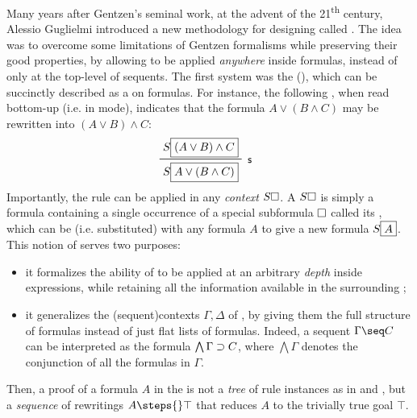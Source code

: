 Many years after Gentzen's seminal work, at the advent of the
21\textsuperscript{th} century, Alessio Guglielmi introduced a new methodology
for designing  called 
. The idea was to overcome some limitations of
Gentzen formalisms while preserving their good properties, by allowing
 to be applied \emph{anywhere} inside formulas, instead of
only at the top-level of sequents. The
first  system was the 
(), which can be succinctly described as a 
on formulas. For instance, the following , when read
bottom-up (i.e. in  mode), indicates that the formula $A \lor (B
\land C)$ may be rewritten into $(A \lor B) \land C$:
$$\R[\rsf{s}]{S\select{(A \lor B) \land C}}{S\select{A \lor (B \land C)}}$$
Importantly, the rule can be applied in any \emph{context} $S\square$. A
 $S\square$ is simply a formula containing a single occurrence of a
special subformula $\square$ called its , which can be 
(i.e. substituted) with any formula $A$ to give a new formula $S\fbox{$A$}$.
This notion of  serves two purposes:
\begin{itemize}
  \item it formalizes the ability of  to be applied at an
  arbitrary \emph{depth} inside expressions, while retaining all the information
  available in the surrounding ;
  \item it generalizes the \kl(sequent){contexts} $\Gamma, \Delta$ of
  , by giving them the full structure of formulas instead
  of just flat lists of formulas. Indeed, a sequent $\Gamma \seq C$ can be
  interpreted as the formula $\bigwedge \Gamma \supset C$, where $\bigwedge
  \Gamma$ denotes the conjunction of all the formulas in $\Gamma$.
\end{itemize}
Then, a proof of a formula $A$ in the  is not a
\emph{tree} of rule instances as in  and , but a \emph{sequence} of rewritings $A \steps{} \top$ that reduces
$A$ to the trivially true goal $\top$.


